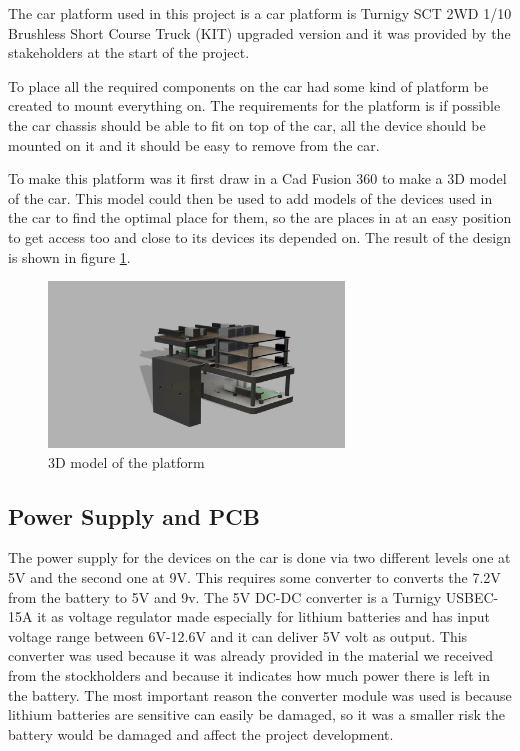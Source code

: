 \documentclass[11pt, titlepage]{article} %
\begin{document}
The car platform used in this project is a car platform is Turnigy SCT 2WD 1/10 Brushless Short Course Truck (KIT) upgraded version and it was provided by the stakeholders at the start of the project. 

To place all the required components on the car had some kind of platform be created to mount everything on. The requirements for the platform is if possible the car chassis should be able to fit on top of the car, all the device should be mounted on it and it should be easy to remove from the car. 

To make this platform was it first draw in a Cad Fusion 360 to make a 3D model of the car. This model could then be used to add models of the devices used in the car to find the optimal place for them, so the are places in at an easy position to get access too and close to its devices its depended on. The result of the design is shown in figure \ref{fig:3d_platform}. 

\begin{figure}
	\includegraphics[width=0.7\textwidth]{platform.png}
	\caption{3D model of the platform}
	\label{fig:3d_platform}
\end{figure}

\subsection{Power Supply and PCB}

The power supply for the devices on the car is done via two different levels one at 5V and the second one at 9V. This requires some converter to converts the 7.2V from the battery to 5V and 9v. The 5V DC-DC converter is a Turnigy USBEC-15A it as voltage regulator made especially for lithium batteries and has input voltage range between 6V-12.6V and it can deliver 5V volt as output. This converter was used because it was already provided in the material we received from the stockholders and because it indicates how much power there is left in the battery. The most important reason the converter module was used is because lithium batteries are sensitive can easily be damaged, so it was a smaller risk the battery would be damaged and affect the project development. 
\end{document}
